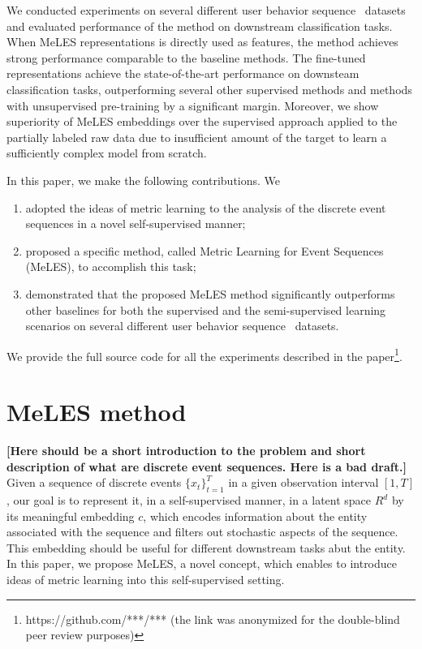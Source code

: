 \documentclass{article}
\newcommand{\nt}[1]{{\bf [#1]}}
\begin{document}
We conducted experiments on several different user behavior sequence~\cite{Ni2018PerceiveYU} datasets and evaluated performance of the method on downstream classification tasks. When MeLES representations is directly used as features, the method achieves strong performance comparable to the baseline methods. The fine-tuned representations achieve the state-of-the-art performance on downsteam classification tasks, outperforming several other supervised methods and methods with unsupervised pre-training by a significant margin. Moreover, we show superiority of MeLES embeddings over the supervised approach applied to the partially labeled raw data due to insufficient amount of the target to learn a sufficiently complex model from scratch.

In this paper, we make the following contributions. We
\begin{enumerate}
    \item adopted the ideas of metric learning to the analysis of the discrete event sequences in a novel self-supervised manner;
    \item proposed a specific method, called Metric Learning for Event Sequences (MeLES), to accomplish this task;
    \item demonstrated that the proposed MeLES method significantly outperforms other baselines for both the supervised and the semi-supervised learning scenarios on several different user behavior sequence~\cite{Ni2018PerceiveYU} datasets.
\end{enumerate}

We provide the full source code for all the experiments described in the paper\footnote{https://github.com/***/*** (the link was anonymized for the double-blind peer review purposes)}.


\section{MeLES method} \label{sec-method}

\nt{Here should be a short introduction to the problem and short description of what are discrete event sequences. Here is a bad draft.} Given a sequence of discrete events $\{x_t \}^T_{t=1}$ in a given observation interval $[1, T]$, our goal is to represent it, in a self-supervised manner, in a latent space $R^d$ by its meaningful embedding $c$, which encodes information about the entity associated with the sequence and filters out stochastic aspects of the sequence. This embedding should be useful for different downstream tasks abut the entity. In this paper, we propose MeLES, a novel concept, which enables to introduce ideas of metric learning into this self-supervised setting.
\end{document}
